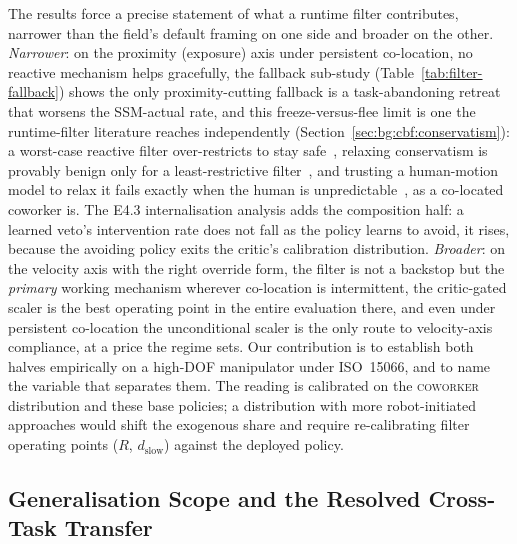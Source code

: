 \documentclass[11pt,a4paper]{report}
\newcommand{\ssm}{SSM}
\newcommand{\iso}{ISO~15066}
\newcommand{\coworker}{\textsc{coworker}}
\begin{document}
The results force a precise statement of what a runtime filter
contributes, narrower than the field's default framing on one side
and broader on the other. \emph{Narrower}: on the proximity
(exposure) axis under persistent co-location, no reactive mechanism
helps gracefully, the fallback sub-study
(Table~\ref{tab:filter-fallback}) shows the only proximity-cutting
fallback is a task-abandoning retreat that worsens the
\ssm{}-actual rate, and this freeze-versus-flee limit is one the
runtime-filter literature reaches independently
(Section~\ref{sec:bg:cbf:conservatism}): a worst-case reactive
filter over-restricts to stay safe~\cite{tian2022confidence},
relaxing conservatism is provably benign only for a
least-restrictive filter~\cite{permissivefilter2025}, and trusting a
human-motion model to relax it fails exactly when the human is
unpredictable~\cite{tian2022confidence}, as a co-located coworker
is. The E4.3 internalisation analysis adds the composition half: a
learned veto's intervention rate does not fall as the policy learns
to avoid, it rises, because the avoiding policy exits the critic's
calibration distribution. \emph{Broader}: on the velocity axis with
the right override form, the filter is not a backstop but the
\emph{primary} working mechanism wherever co-location is
intermittent, the critic-gated scaler is the best operating point in
the entire evaluation there, and even under persistent co-location
the unconditional scaler is the only route to velocity-axis
compliance, at a price the regime sets. Our contribution is to
establish both halves empirically on a high-DOF manipulator under
\iso{}, and to name the variable that separates them. The reading is
calibrated on the \coworker{} distribution and these base policies; a
distribution with more robot-initiated approaches would shift the
exogenous share and require re-calibrating filter operating points
($R$, $d_{\mathrm{slow}}$) against the deployed policy.

\subsection{Generalisation Scope and the Resolved Cross-Task Transfer}
\label{sec:disc:arch-gen}
\end{document}
